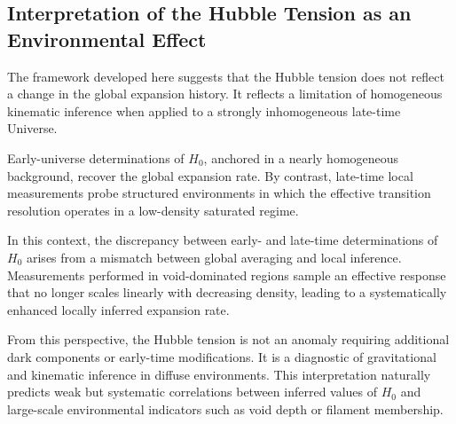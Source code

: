 \subsection{Interpretation of the Hubble Tension as an Environmental Effect}
  \label{subsec:interpretation-of-the-hubble-tension-as-an-environmental-effect}

  The framework developed here suggests that the Hubble tension does not reflect a
  change in the global expansion history.
  It reflects a limitation of homogeneous kinematic inference when applied to a
  strongly inhomogeneous late-time Universe.

  Early-universe determinations of \(H_0\),
  anchored in a nearly homogeneous background,
  recover the global expansion rate.
  By contrast, late-time local measurements probe structured environments in which
  the effective transition resolution operates in a low-density saturated regime.

  In this context, the discrepancy between early- and late-time determinations of
  \(H_0\) arises from a mismatch between global averaging and local inference.
  Measurements performed in void-dominated regions sample an effective response
  that no longer scales linearly with decreasing density,
  leading to a systematically enhanced locally inferred expansion rate.

  From this perspective, the Hubble tension is not an anomaly requiring additional
  dark components or early-time modifications.
  It is a diagnostic of gravitational and kinematic inference in diffuse
  environments.
  This interpretation naturally predicts weak but systematic correlations between
  inferred values of \(H_0\) and large-scale environmental indicators such as void
  depth or filament membership.

